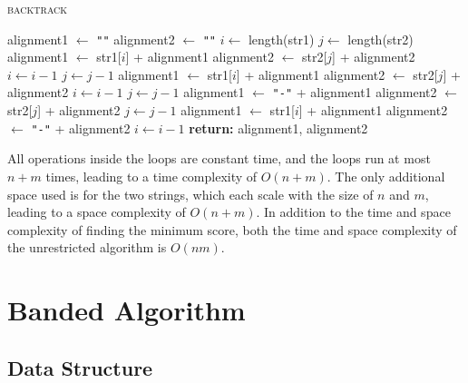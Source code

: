 \documentclass[12pt]{article}
\begin{document}
\begin{algorithm}[H]
    \caption{\textsc{backtrack}}
    \label{alg:backtrack}
    \begin{algorithmic}[1]
        \State alignment1 $\gets$ \texttt{""}
        \State alignment2 $\gets$ \texttt{""}
        \State $i \gets$ length(str1)
        \State $j \gets$ length(str2)
         
                \State alignment1 $\gets$ str1[$i$] + alignment1
                \State alignment2 $\gets$ str2[$j$] + alignment2
                \State $i \gets i - 1$
                \State $j \gets j - 1$
                \State alignment1 $\gets$ str1[$i$] + alignment1
                \State alignment2 $\gets$ str2[$j$] + alignment2
                \State $i \gets i - 1$
                \State $j \gets j - 1$
                \State alignment1 $\gets$ \texttt{"-"} + alignment1
                \State alignment2 $\gets$ str2[$j$] + alignment2
                \State $j \gets j - 1$
                \State alignment1 $\gets$ str1[$i$] + alignment1
                \State alignment2 $\gets$ \texttt{"-"} + alignment2
                \State $i \gets i - 1$
            \EndIf
        \EndWhile
        \State \textbf{return:} alignment1, alignment2
    \end{algorithmic}
\end{algorithm}

All operations inside the loops are constant time, and the loops run at most
$n + m$ times, leading to a time complexity of $O(n + m)$. The only additional
space used is for the two strings, which each scale with the size of $n$ and $m$,
leading to a space complexity of $O(n + m)$. In addition to the time and space
complexity of finding the minimum score, both the time and space complexity of
the unrestricted algorithm is $O(nm)$.

\newpage

\section{Banded Algorithm}

\subsection{Data Structure}
\end{document}
